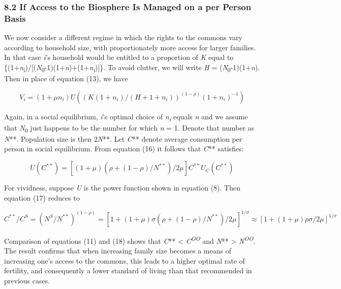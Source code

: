 \documentclass[man,11pt,a4paper,floatsintext]{apa7}
\begin{document}
\subsubsection{8.2 If Access to the Biosphere Is Managed on a per Person Basis}

We now consider a different regime in which the rights to the commons vary according to household size, with proportionately more access for larger families. In that case \textit{i}'s household would be entitled to a proportion of \textit{K} equal to \{(1+\textit{n}\textsubscript{i})/[(\textit{N}\textsubscript{0}-1)(1+\textit{n})+(1+\textit{n}\textsubscript{\textit{i}})]\}. To avoid clutter, we will write \textit{H} = (\textit{N}\textsubscript{0}-1)(1+\textit{n}). Then in place of equation (13), we have

\begin{equation}
V_i = (1+\mu n_i)U((K(1+n_i)/(H+1+n_i))^{(1-\rho)}(1+n_i)^{-1})
\tag{16}
\end{equation}

Again, in a social equilibrium, \textit{i}'s optimal choice of \textit{n}\textsubscript{\textit{i}} equals \textit{n} and we assume that \textit{N}\textsubscript{0} just happens to be the number for which \textit{n} = 1. Denote that number as \textit{N}**. Population size is then 2\textit{N}**. Let \textit{C}** denote average consumption per person in social equilibrium. From equation (16) it follows that \textit{C}** satisfies:

\begin{equation}
U(C^{**}) = [(1+\mu)(\rho+(1-\rho)/N^{**})/2\mu]C^{**}U_C(C^{**})
\tag{17}
\end{equation}

\noindent For vividness, suppose \textit{U} is the power function shown in equation (8). Then equation (17) reduces to

\begin{equation}
C^{**}/C^S = (N^S/N^{**})^{(1-\rho)} = [1+(1+\mu)\sigma(\rho+(1-\rho)/N^{**})/2\mu]^{1/\sigma} \approx [1+(1+\mu)\rho\sigma/2\mu]^{1/\sigma}
\tag{18}
\end{equation}

\noindent Comparison of equations (11) and (18) shows that \textit{C}** \textless{} \textit{C}\textsuperscript{\textit{OO}} and \textit{N}** \textgreater{} \textit{N}\textsuperscript{\textit{OO}}. The result confirms that when increasing family size becomes a means of increasing one's access to the commons, this leads to a higher optimal rate of fertility, and consequently a lower standard of living than that recommended in previous cases.
\end{document}
